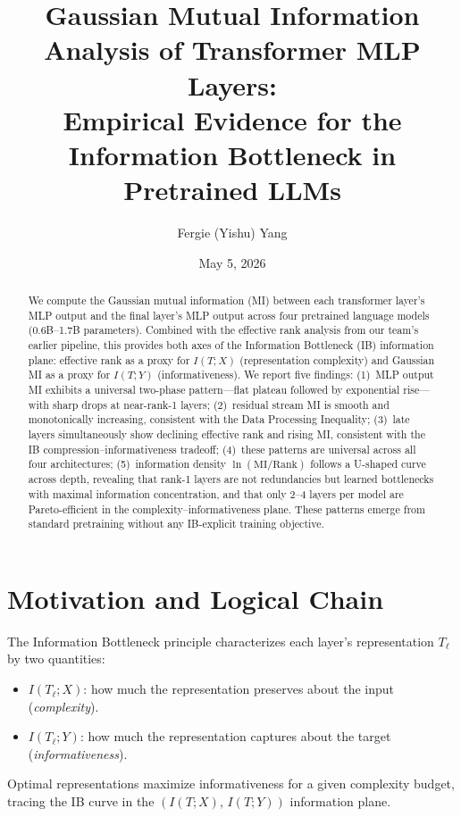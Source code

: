 \documentclass[11pt]{article}
\title{Gaussian Mutual Information Analysis of Transformer MLP Layers:\\
Empirical Evidence for the Information Bottleneck in Pretrained LLMs}
\author{Fergie (Yishu) Yang}
\date{May 5, 2026}
\begin{document}
\maketitle

\begin{abstract}
We compute the Gaussian mutual information (MI) between each transformer layer's MLP output and the final layer's MLP output across four pretrained language models (0.6B--1.7B parameters). Combined with the effective rank analysis from our team's earlier pipeline, this provides both axes of the Information Bottleneck (IB) information plane: effective rank as a proxy for $I(T;X)$ (representation complexity) and Gaussian MI as a proxy for $I(T;Y)$ (informativeness). We report five findings: (1)~MLP output MI exhibits a universal two-phase pattern---flat plateau followed by exponential rise---with sharp drops at near-rank-1 layers; (2)~residual stream MI is smooth and monotonically increasing, consistent with the Data Processing Inequality; (3)~late layers simultaneously show declining effective rank and rising MI, consistent with the IB compression--informativeness tradeoff; (4)~these patterns are universal across all four architectures; (5)~information density $\ln(\mathrm{MI}/\mathrm{Rank})$ follows a U-shaped curve across depth, revealing that rank-1 layers are not redundancies but learned bottlenecks with maximal information concentration, and that only 2--4 layers per model are Pareto-efficient in the complexity--informativeness plane. These patterns emerge from standard pretraining without any IB-explicit training objective.
\end{abstract}

\section{Motivation and Logical Chain}

The Information Bottleneck principle \cite{tishby2015} characterizes each layer's representation $T_\ell$ by two quantities:
\begin{itemize}
    \item $I(T_\ell; X)$: how much the representation preserves about the input (\emph{complexity}).
    \item $I(T_\ell; Y)$: how much the representation captures about the target (\emph{informativeness}).
\end{itemize}
Optimal representations maximize informativeness for a given complexity budget, tracing the IB curve in the $(I(T;X),\, I(T;Y))$ information plane.
\end{document}
